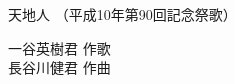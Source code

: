 \documentclass[10pt,b5j]{tarticle} %
\begin{document}
\begin{minipage}[c]{0.7\hsize} %
    \begin{center}
        {\LARGE
            天地人 %
        }
        {\small 
            （平成10年第90回記念祭歌） %
        }
    \end{center}
\end{minipage}
\begin{minipage}[c]{0.3\hsize} %
    \begin{flushright} %
        一谷英樹君 作歌\\長谷川健君 作曲 %
    \end{flushright}
\end{minipage}
\end{document}
